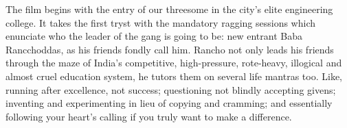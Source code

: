 \documentclass{article}
\begin{document}
The film begins with the entry of our threesome in the city's elite engineering college. It takes the first tryst with the mandatory ragging sessions which enunciate who the leader of the gang is going to be: new entrant Baba Rancchoddas, as his friends fondly call him. Rancho not only leads his friends through the maze of India's competitive, high-pressure, rote-heavy, illogical and almost cruel education system, he tutors them on several life mantras too. Like, running after excellence, not success; questioning not blindly accepting givens; inventing and experimenting in lieu of copying and cramming; and essentially following your heart's calling if you truly want to make a difference.
\end{document}
